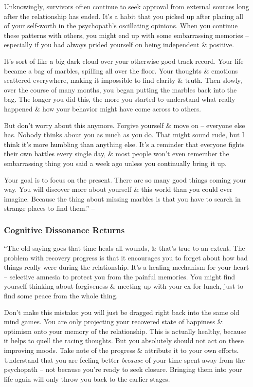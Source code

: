 \documentclass{article}
\numberwithin{equation}{section}
\begin{document}
Unknowingly, survivors often continue to seek approval from external sources long after the relationship has ended. It's a habit that you picked up after placing all of your self-worth in the psychopath's oscillating opinions. When you continue these patterns with others, you might end up with some embarrassing memories -- especially if you had always prided yourself on being independent \& positive.

It's sort of like a big dark cloud over your otherwise good track record. Your life became a bag of marbles, spilling all over the floor. Your thoughts \& emotions scattered everywhere, making it impossible to find clarity \& truth. Then slowly, over the course of many months, you began putting the marbles back into the bag. The longer you did this, the more you started to understand what really happened \& how your behavior might have come across to others.

But don't worry about this anymore. Forgive yourself \& move on -- everyone else has. Nobody thinks about you as much as you do. That might sound rude, but I think it's more humbling than anything else. It's a reminder that everyone fights their own battles every single day, \& most people won't even remember the embarrassing thing you said a week ago unless you continually bring it up.

Your goal is to focus on the present. There are so many good things coming your way. You will discover more about yourself \& this world than you could ever imagine. Because the thing about missing marbles is that you have to search in strange places to find them.'' -- \cite[pp. 132--133]{MacKenzie2015}

\subsubsection{Cognitive Dissonance Returns}
``The old saying goes that time heals all wounds, \& that's true to an extent. The problem with recovery progress is that it encourages you to forget about how bad things really were during the relationship. It's a healing mechanism for your heart -- selective amnesia to protect you from the painful memories. You might find yourself thinking about forgiveness \& meeting up with your ex for lunch, just to find some peace from the whole thing.

Don't make this mistake: you will just be dragged right back into the same old mind games. You are only projecting your recovered state of happiness \& optimism onto your memory of the relationship. This is actually healthy, because it helps to quell the racing thoughts. But you absolutely should not act on these improving moods. Take note of the progress \& attribute it to your own efforts. Understand that you are feeling better \textit{because} of your time spent away from the psychopath -- not because you're ready to seek closure. Bringing them into your life again will only throw you back to the earlier stages.
\end{document}
